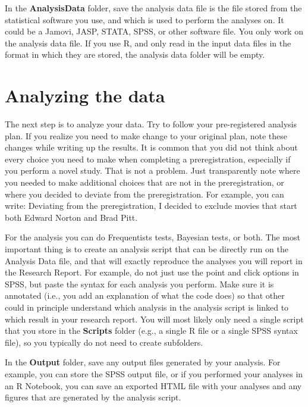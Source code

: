 \documentclass[
  oneside]{book}
\begin{document}
In the \textbf{AnalysisData} folder, save the analysis data file is the file stored from the statistical software you use, and which is used to perform the analyses on. It could be a Jamovi, JASP, STATA, SPSS, or other software file. You only work on the analysis data file. If you use R, and only read in the input data files in the format in which they are stored, the analysis data folder will be empty.

\hypertarget{analyzing-the-data}{%
\section{Analyzing the data}\label{analyzing-the-data}}

The next step is to analyze your data. Try to follow your pre-registered analysis plan. If you realize you need to make change to your original plan, note these changes while writing up the results. It is common that you did not think about every choice you need to make when completing a preregistration, especially if you perform a novel study. That is not a problem. Just transparently note where you needed to make additional choices that are not in the preregistration, or where you decided to deviate from the preregistration. For example, you can write: Deviating from the preregistration, I decided to exclude movies that start both Edward Norton and Brad Pitt.

For the analysis you can do Frequentists tests, Bayesian tests, or both. The most important thing is to create an analysis script that can be directly run on the Analysis Data file, and that will exactly reproduce the analyses you will report in the Research Report. For example, do not just use the point and click options in SPSS, but paste the syntax for each analysis you perform. Make sure it is annotated (i.e., you add an explanation of what the code does) so that other could in principle understand which analysis in the analysis script is linked to which result in your research report. You will most likely only need a single script that you store in the \textbf{Scripts} folder (e.g., a single R file or a single SPSS syntax file), so you typically do not need to create subfolders.

In the \textbf{Output} folder, save any output files generated by your analysis. For example, you can store the SPSS output file, or if you performed your analyses in an R Notebook, you can save an exported HTML file with your analyses and any figures that are generated by the analysis script.
\end{document}
